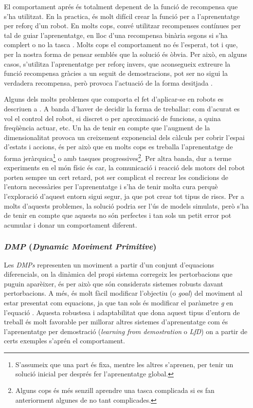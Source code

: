 \documentclass[12pt,a4paper,final,twoside]{article}
\begin{document}
El comportament aprés és totalment depenent de la funció de recompensa que s'ha utilitzat. En la practica, és molt difícil crear la funció per a l'aprenentatge per reforç d'un robot. En molts cops, convé utilitzar recompenses contínues per tal de guiar l'aprenentatge, en lloc d'una recompensa binària segons si s'ha complert o no la tasca \cite{Laud2004}. Molts cops el comportament no és l'esperat, tot i que, per la nostra forma de pensar semblés que la solució és òbvia. Per això, en alguns casos, s'utilitza l'aprenentatge per reforç invers, que aconsegueix extreure la funció recompensa gràcies a un seguit de demostracions, pot ser no sigui la verdadera recompensa, però provoca l'actuació de la forma desitjada \cite{Kober2009}.

Alguns dels molts problemes que comporta el fet d'aplicar-se en robots es descriuen a \cite{Kober2009}. A banda d'haver de decidir la forma de treballar: com d'acurat es vol el control del robot, si discret o per aproximació de funcions, a quina freqüència actuar, etc. Un ha de tenir en compte que l'augment de la dimensionalitat provoca un creixement exponencial dels càlculs per cobrir l'espai d'estats i accions, és per això que en molts cops es treballa l'aprenentatge de forma jeràrquica\footnote{S'assumeix que una part és fixa, mentre les altres s'aprenen, per tenir un solució inicial per després fer l'aprenentatge global.} o amb tasques progressives\footnote{Alguns cops és més senzill aprendre una tasca complicada si es fan anteriorment algunes de no tant complicades.}. 
Per altra banda, dur a terme experiments en el món físic és car, la comunicació i reacció dels motors del robot porten sempre un cert retard, pot ser complicat el recrear les condicions de l'entorn necessàries per l'aprenentatge i s'ha de tenir molta cura perquè l'exploració d'aquest entorn sigui segur, ja que pot crear tot tipus de riscs. Per a molts d'aquests problemes, la solució podria ser l'ús de models simulats, però s'ha de tenir en compte que aquests no són perfectes i tan sols un petit error pot acumular i donar un comportament diferent.

\subsubsection{\textit{DMP} (\textit{\textbf{D}ynamic \textbf{M}oviment \textbf{P}rimitive})}
\label{DMP-estat-de-l'art}

Les \textit{DMPs} representen un moviment a partir d'un conjunt d'equacions diferencials, on la dinàmica del propi sistema corregeix les pertorbacions que puguin aparèixer, és per això que són considerats sistemes robusts davant pertorbacions. A més, és molt fàcil modificar l'objectiu (o \textit{goal}) del moviment al estar presentat com equacions, ja que tan sols és modificar el paràmetre \textit{g} en l'equació . Aquesta robustesa i adaptabilitat que dona aquest tipus d'entorn de treball és molt favorable per millorar altres sistemes d'aprenentatge com és l'aprenentatge per demostració (\textit{learning from demostration} o \textit{LfD}) on a partir de certs exemples s'aprén el comportament.
\end{document}
